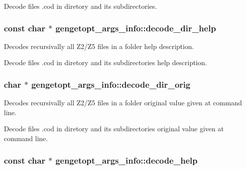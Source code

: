 Decode files .cod in diretory and its subdirectories. \hypertarget{structgengetopt__args__info_a6292363bbfa2c413ad4fbe9938b36ad0}{}
\subsubsection[{decode\+\_\+dir\+\_\+help}]{\setlength{\rightskip}{0pt plus 5cm}const char $\ast$ gengetopt\+\_\+args\+\_\+info\+::decode\+\_\+dir\+\_\+help}\label{structgengetopt__args__info_a6292363bbfa2c413ad4fbe9938b36ad0}


Decodes recursivally all Z2/\+Z5 files in a folder help description. 

Decode files .cod in diretory and its subdirectories help description. \hypertarget{structgengetopt__args__info_acca497056dfc93c6d01dead7856a2318}{}
\subsubsection[{decode\+\_\+dir\+\_\+orig}]{\setlength{\rightskip}{0pt plus 5cm}char $\ast$ gengetopt\+\_\+args\+\_\+info\+::decode\+\_\+dir\+\_\+orig}\label{structgengetopt__args__info_acca497056dfc93c6d01dead7856a2318}


Decodes recursivally all Z2/\+Z5 files in a folder original value given at command line. 

Decode files .cod in diretory and its subdirectories original value given at command line. \hypertarget{structgengetopt__args__info_a39def96c6bc0331ae3da8fdfc598901a}{}
\subsubsection[{decode\+\_\+help}]{\setlength{\rightskip}{0pt plus 5cm}const char $\ast$ gengetopt\+\_\+args\+\_\+info\+::decode\+\_\+help}\label{structgengetopt__args__info_a39def96c6bc0331ae3da8fdfc598901a}


